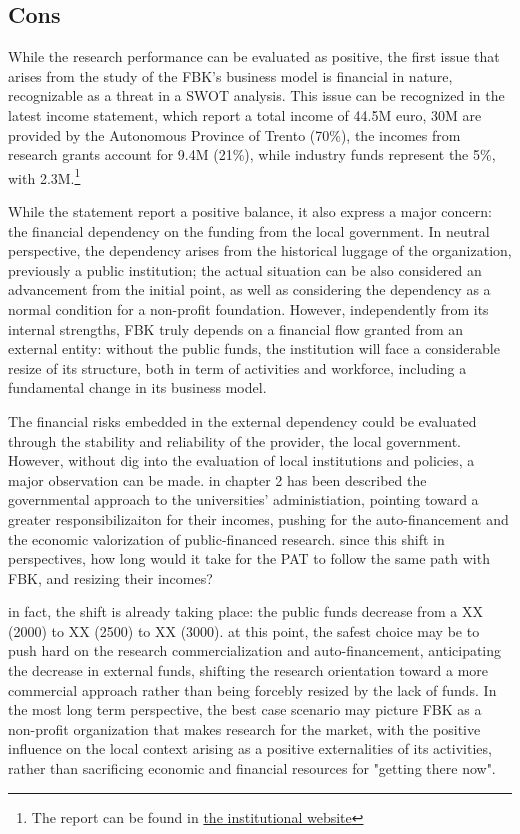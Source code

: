 \subsection{Cons}

While the research performance can be evaluated as positive, the first issue that arises from the study of the FBK's business model is financial in nature, recognizable as a threat in a SWOT analysis. This issue can be recognized in the latest income statement, which report a total income of 44.5M euro, 30M are provided by the Autonomous Province of Trento (70\%), the incomes from research grants account for 9.4M (21\%), while industry funds represent the 5\%, with 2.3M.\footnote{The report can be found in \href{https://trasparenza.fbk.eu/Bilanci/Bilancio-preventivo-e-consuntivo}{the institutional website}}

While the statement report a positive balance, it also express a major concern: the financial dependency on the funding from the local government. In neutral perspective, the dependency arises from the historical luggage of the organization, previously a public institution; the actual situation can be also considered an advancement from the initial point, as well as considering the dependency as a normal condition for a non-profit foundation. However, independently from its internal strengths, FBK truly depends on a financial flow granted from an external entity: without the public funds, the institution will face a considerable resize of its structure, both in term of activities and workforce, including a fundamental change in its business model.

The financial risks embedded in the external dependency could be evaluated through the stability and reliability of the provider, the local government. However, without dig into the evaluation of local institutions and policies, a major observation can be made. in chapter 2 has been described the governmental approach to the universities' administiation, pointing toward a greater responsibilizaiton for their incomes, pushing for the auto-financement and the economic valorization of public-financed research. since this shift in perspectives, how long would it take for the PAT to follow the same path with FBK, and resizing their incomes?

in fact, the shift is already taking place: the public funds decrease from a XX (2000) to XX (2500) to XX (3000). at this point, the safest choice may be to push hard on the research commercialization and auto-financement, anticipating the decrease in external funds, shifting the research orientation toward a more commercial approach rather than being forcebly resized by the lack of funds. In the most long term perspective, the best case scenario may picture FBK as a non-profit organization that makes research for the market, with the positive influence on the local context arising as a positive externalities of its activities, rather than sacrificing economic and financial resources for "getting there now".

